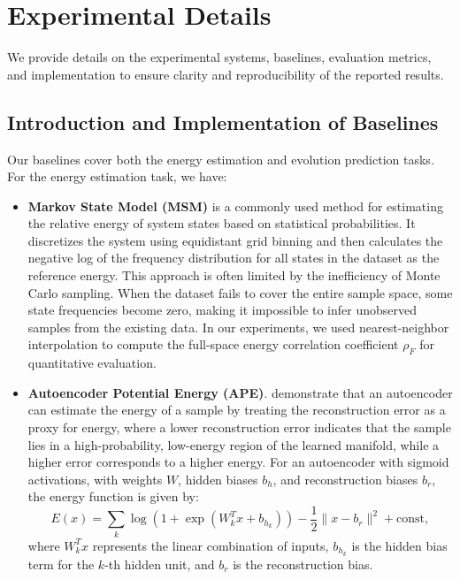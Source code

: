 \appendix

\section{Experimental Details}

We provide details on the experimental systems, baselines, evaluation metrics, and implementation to ensure clarity and reproducibility of the reported results.

\subsection{Introduction and Implementation of Baselines}

Our baselines cover both the energy estimation and evolution prediction tasks. For the energy estimation task, we have:
\begin{itemize}
    \item \textbf{Markov State Model (MSM)} is a commonly used method for estimating the relative energy of system states based on statistical probabilities. It discretizes the system using equidistant grid binning and then calculates the negative log of the frequency distribution for all states in the dataset as the reference energy. This approach is often limited by the inefficiency of Monte Carlo sampling. When the dataset fails to cover the entire sample space, some state frequencies become zero, making it impossible to infer unobserved samples from the existing data. In our experiments, we used nearest-neighbor interpolation to compute the full-space energy correlation coefficient $\rho_F$ for quantitative evaluation.
    
    \item \textbf{Autoencoder Potential Energy (APE)}. \citet{kamyshanska2014potential} demonstrate that an autoencoder can estimate the energy of a sample by treating the reconstruction error as a proxy for energy, where a lower reconstruction error indicates that the sample lies in a high-probability, low-energy region of the learned manifold, while a higher error corresponds to a higher energy. For an autoencoder with sigmoid activations, with weights \( W \), hidden biases \( b_h \), and reconstruction biases \( b_r \), the energy function is given by:\[E(x) = \sum_k \log(1 + \exp(W_k^T x + b_{h_k})) - \frac{1}{2} \|x - b_r\|^2 + \text{const}, \]where \( W_k^T x \) represents the linear combination of inputs, \( b_{h_k} \) is the hidden bias term for the \( k \)-th hidden unit, and \( b_r \) is the reconstruction bias.
\end{itemize}

